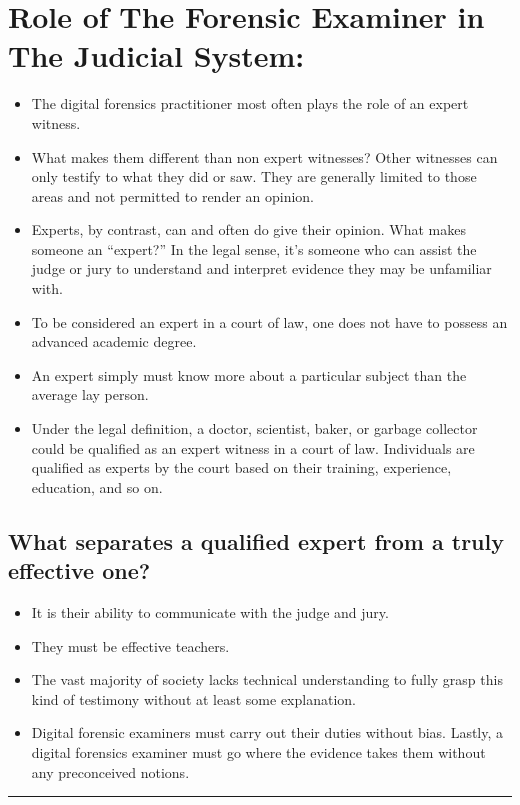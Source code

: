 \documentclass[british]{article}
\begin{document}
\section{Role of The Forensic Examiner in The Judicial System:}
\begin{itemize}
	\item The digital forensics practitioner most often plays the role of an
	      expert witness.
	\item What makes them different than non expert witnesses? Other witnesses
	      can only testify to what they did or saw. They are generally limited
	      to those areas and not permitted to render an opinion.
	\item Experts, by contrast, can and often do give their opinion. What makes
	      someone an ``expert?'' In the legal sense, it's someone who can
	      assist the judge or jury to understand and interpret evidence they
	      may be unfamiliar with.
	\item To be considered an expert in a court of law, one does not have to
	      possess an advanced academic degree.
	\item An expert simply must know more about a particular subject than the
	      average lay person.
	\item Under the legal definition, a doctor, scientist, baker, or garbage
	      collector could be qualified as an expert witness in a court of law.
	      Individuals are qualified as experts by the court based on their training,
	      experience, education, and so on.
\end{itemize}

\subsection{What separates a qualified expert from a truly effective one? }
\begin{itemize}
	\item It is their ability to communicate with the judge and jury.
	\item They must be effective teachers.
	\item The vast majority of society lacks technical understanding to fully
	      grasp this kind of testimony without at least some explanation.
	\item Digital forensic examiners must carry out their duties without bias.
	      Lastly, a digital forensics examiner must go where the evidence takes
	      them without any preconceived notions.
\end{itemize}
\rule[0.5ex]{0.75\columnwidth}{1pt}
\end{document}
